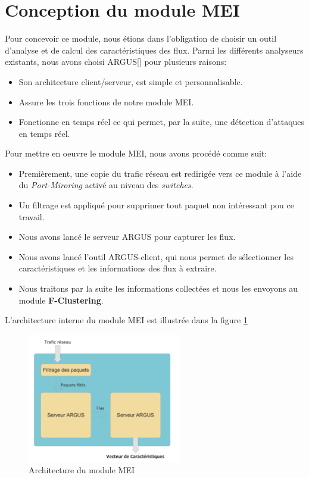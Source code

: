 \section{Conception du module MEI}
Pour concevoir ce module, nous étions dans l’obligation de choisir un outil d’analyse et de calcul des caractéristiques des flux. Parmi les différents analyseurs existants, nous avons choisi ARGUS[\cite{31}] pour plusieurs raisons:\\
\begin{itemize}
\item[-] Son architecture client/serveur, est simple et personnalisable.
\item[-] Assure les trois fonctions de notre module MEI.
\item[-] Fonctionne en temps réel ce qui permet, par la suite, une détection d'attaques en temps réel.\\
\end{itemize} 
Pour mettre en oeuvre le module MEI, nous avons procédé comme suit:\\
\begin{itemize}
\item[1-] Premièrement, une copie du trafic réseau est redirigée vers ce module à l'aide du \textit{Port-Miroring} activé au niveau des \textit{switches}.\\
\item[2-] Un filtrage est appliqué pour supprimer tout paquet non intéressant pou ce travail.\\
\item[3-] Nous avons lancé le serveur ARGUS pour capturer les flux.\\
\item[4-] Nous avons lancé l’outil ARGUS-client, qui nous permet de sélectionner les caractéristiques et les informations des flux à extraire.\\
\item[5-] Nous traitons par la suite les informations collectées et nous les envoyons au module \textbf{F-Clustering}.\\
\end{itemize}

L'architecture interne du module MEI est illustrée dans la figure \ref{fig:MEI}
\begin{figure}[h]
\centering
\includegraphics[width=0.6\textwidth]{Figures/MEI}
\decoRule
\caption{Architecture du module MEI}
\label{fig:MEI}
\end{figure} 

